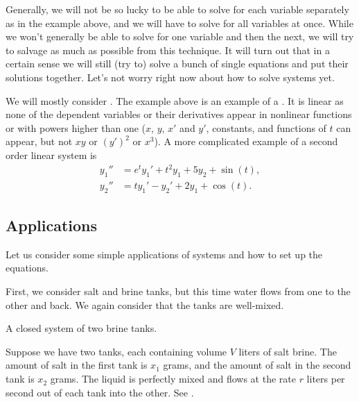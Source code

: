 \documentclass{ximera}
\begin{document}
Generally, we will not be so lucky to be able to solve for each variable separately as in the  example above, and we will have to solve for all variables at once. While we won't generally be able to solve for one variable and then the next, we will try to salvage as much as possible from this technique. It will turn out that in a certain sense we will still (try to) solve a bunch of single equations and put their solutions together.  Let's not worry right now about how to solve systems yet. 

We will mostly consider \emph{}.  The example above is an example of a \emph{}. It is linear as none of the dependent variables or their derivatives appear in nonlinear functions or with powers higher than one ($x$, $y$, $x'$ and $y'$, constants, and functions of $t$ can appear, but not $xy$ or ${(y')}^2$ or $x^3$).  A more complicated example of a second order linear system is 
\begin{align*}
    y_1'' &= e^t y_1' + t^2 y_1 + 5 y_2 + \sin(t), \\
    y_2'' &= t y_1'-y_2' + 2 y_1 + \cos(t).
\end{align*}

\subsection{Applications}

Let us consider some simple applications of systems and how to set up the equations.

\begin{example} \label{sintro:closedbrine-example}
    First, we consider salt and brine tanks, but this time water flows from one to the other and back.  We again consider that the tanks are well-mixed.
    
    \begin{myfig}
        \capstart
        
        \caption{A closed system of two brine tanks.\label{sintro:closedbrine}}
    \end{myfig}
    
    Suppose we have two tanks, each containing volume $V$ liters of salt brine. The amount of salt in the first tank is $x_1$ grams, and the amount of salt in the second tank is $x_2$ grams.  The liquid is perfectly mixed and flows at the rate $r$ liters per second out of each tank into the other. See . 
\end{example}
\end{document}
